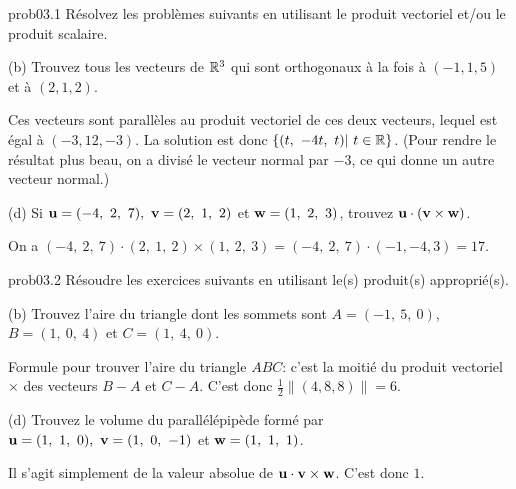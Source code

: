 \begin{sol}{prob03.1}  Résolvez les problèmes suivants en utilisant le produit vectoriel et/ou le produit scalaire.
  
 \medskip
(b) Trouvez tous les vecteurs de $\mathbb{R}^3$ qui sont orthogonaux à la fois à $(-1, 1, 5)$ et à $(2, 1, 2)$. 

\soln Ces vecteurs sont parallèles au produit vectoriel de ces deux vecteurs, lequel est égal à $(-3, 12, -3)$. La solution est donc $\{(t,\ -4t,\ t)|\ t\in \mathbb{R}\}$. (Pour rendre le résultat plus beau, on a divisé le vecteur normal par $-3$, ce qui donne un autre vecteur normal.)
 
\medskip

 

(d) Si $\uu=(-4,\ 2,\ 7),\ \vv=(2,\ 1,\ 2)$ et 
$\mathbf{w}=(1,\ 2,\ 3)$, trouvez $\mathbf{u}\cdot (\mathbf{v}\times \mathbf{w})$. \medskip

\soln On a $(-4,\ 2,\ 7)\cdot (2,\ 1,\ 2)\times (1,\ 2,\ 3)= (-4,\ 2,\ 7)\cdot (-1, -4, 3)=17$.
 \end{sol}
 \medskip
 
\bigskip
\begin{sol}{prob03.2}  Résoudre les exercices suivants en utilisant le(s) produit(s) approprié(s).

\medskip
(b) Trouvez l'aire du triangle dont les sommets sont $A=(-1,\ 5,\
0)$, $B=(1,\ 0,\ 4)$ et $C=(1,\ 4,\ 0)$. 

\soln Formule pour trouver l'aire du triangle $ABC$: c'est la moitié du produit vectoriel $\times$ des vecteurs $B-A$ et $C-A$. C'est donc $\frac12\|(4, 8, 8)\|=6$.  

\medskip
(d) Trouvez le volume du parallélépipède formé par $\mathbf{u}=(1,\ 1,\ 0),\ \mathbf{v}=(1,\ 0,\ -1)$ et $\mathbf{w}=(1,\ 1,\ 1)$.

\soln Il s'agit simplement de la valeur absolue de $\mathbf{u} \cdot \mathbf{v} \times \mathbf{w}$. C'est donc $1$.
\medskip


\end{sol} 

